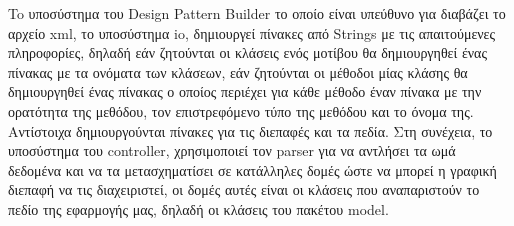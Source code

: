 \par
To υποσύστημα του Design Pattern Builder το οποίο είναι υπεύθυνο για διαβάζει το αρχείο xml, το υποσύστημα io, 
δημιουργεί πίνακες από Strings με τις απαιτούμενες πληροφορίες, δηλαδή εάν ζητούνται οι κλάσεις ενός μοτίβου 
θα δημιουργηθεί ένας πίνακας με τα ονόματα των κλάσεων, εάν ζητούνται οι μέθοδοι μίας κλάσης θα δημιουργηθεί ένας πίνακας 
ο οποίος περιέχει για κάθε μέθοδο έναν πίνακα με την ορατότητα της μεθόδου, τον επιστρεφόμενο τύπο της μεθόδου και το όνομα της. 
Αντίστοιχα δημιουργούνται πίνακες για τις διεπαφές και τα πεδία. Στη συνέχεια, το υποσύστημα του controller, 
χρησιμοποιεί τον parser για να αντλήσει τα ωμά δεδομένα και να τα μετασχηματίσει σε κατάλληλες δομές ώστε να μπορεί 
η γραφική διεπαφή να τις διαχειριστεί, οι δομές αυτές είναι οι κλάσεις που αναπαριστούν το πεδίο της εφαρμογής μας, 
δηλαδή οι κλάσεις του πακέτου model. 
